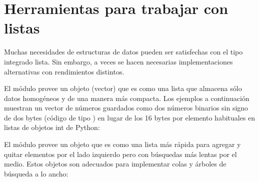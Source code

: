 \documentclass[a5paper,10pt,spanish]{sphinxmanual}
\begin{document}
\section{Herramientas para trabajar con listas}
\label{\detokenize{tutorial/stdlib2:tools-for-working-with-lists}}\label{\detokenize{tutorial/stdlib2:tut-list-tools}}
\sphinxAtStartPar
Muchas necesidades de estructuras de datos pueden ser satisfechas con el tipo integrado lista.  Sin embargo, a veces se hacen necesarias implementaciones alternativas con rendimientos distintos.

\sphinxAtStartPar
El módulo  provee un objeto  (vector) que es como una lista que almacena sólo datos homogéneos y de una manera más compacta.  Los ejemplos a continuación muestran un vector de números guardados como dos números binarios sin signo de dos bytes (código de tipo ) en lugar de los 16 bytes por elemento habituales en listas de objetos int de Python:

\begin{sphinxVerbatim}[commandchars=\\\{\}]
   
   \PYG{p}{[}   \PYG{p}{]}
\PYG{p}{[}\PYG{p}{]}
\end{sphinxVerbatim}

\sphinxAtStartPar
El módulo  provee un objeto  que es como una lista más rápida para agregar y quitar elementos por el lado izquierdo pero con búsquedas más lentas por el medio.  Estos objetos son adecuados para implementar colas y árboles de búsqueda a lo ancho:
\end{document}
